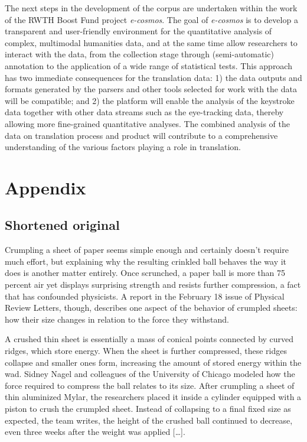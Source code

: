 \documentclass[output=paper]{LSP/langsci}
\begin{document}
The next steps in the development of the corpus are undertaken within the work of the RWTH Boost Fund project \textit{e-cosmos}. The goal of \textit{e-cosmos} is to develop a transparent and user-friendly environment for the quantitative analysis of complex, multimodal humanities data, and at the same time allow researchers to interact with the data, from the collection stage through (semi-automatic) annotation to the application of a wide range of statistical tests. This approach has two immediate consequences for the translation data: 1) the data outputs and formats generated by the parsers and other tools selected for work with the data will be compatible; and 2) the platform will enable the analysis of the keystroke data together with other data streams such as the eye-tracking data, thereby allowing more fine-grained quantitative analyses. The combined analysis of the data on translation process and product will contribute to a comprehensive understanding of the various factors playing a role in translation.  


\section{Appendix}

\subsection{Shortened original}
Crumpling a sheet of paper seems simple enough and certainly doesn't require much effort, but explaining why the resulting crinkled ball behaves the way it does is another matter entirely. Once scrunched, a paper ball is more than 75 percent air yet displays surprising strength and resists further compression, a fact that has confounded physicists. A report in the February 18 issue of Physical Review Letters, though, describes one aspect of the behavior of crumpled sheets: how their size changes in relation to the force they withstand.
 
A crushed thin sheet is essentially a mass of conical points connected by curved ridges, which store energy. When the sheet is further compressed, these ridges collapse and smaller ones form, increasing the amount of stored energy within the wad. Sidney Nagel and colleagues of the University of Chicago modeled how the force required to compress the ball relates to its size. After crumpling a sheet of thin aluminized Mylar, the researchers placed it inside a cylinder equipped with a piston to crush the crumpled sheet. Instead of collapsing to a final fixed size as expected, the team writes, the height of the crushed ball continued to decrease, even three weeks after the weight was applied […].
 
\end{document}
